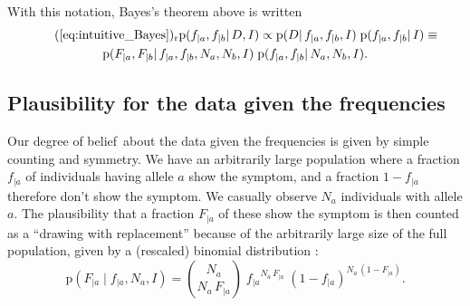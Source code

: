\documentclass[\ifafour a4paper,12pt,\else a5paper,10pt,\fi%
onecolumn,oneside,article,%
british%
]{memoir}
\theoremstyle{remark}
\theoremstyle{innote}
\renewcommand*{\cites}{\parencites}
\newcommand*{\pf}{\mathrm{p}}%
\renewcommand*{\|}{\mathpunct{|}}
\newcommand*{\sect}{\S}%
\newcommand*{\chap}{ch.}%
\newcommand*{\labelbis}[1]{\tag*{(\ref{#1})$_\text{r}$}}
\newcommand*{\dob}{degree of belief}
\newcommand*{\snp}{\textsc{snp}}
\newcommand*{\yD}{D}
\newcommand*{\yI}{I}
\newcommand*{\ya}{a}
\newcommand*{\yb}{b}
\newcommand*{\ysS}{s}%
\begin{document}

With this notation, Bayes's theorem above is written
\begin{multline}
  \labelbis{eq:intuitive_Bayes}
  \pf(f_{|\ya}, f_{|\yb} \| \yD, \yI)
  \propto
  \pf(\yD \|f_{|\ya}, f_{|\yb}, \yI)\;
  \pf(f_{|\ya}, f_{|\yb} \| \yI)
  \equiv{}\\
  \pf(F_{|\ya}, F_{|\yb} \|f_{|\ya}, f_{|\yb}, N_{\ya},N_{\yb},\yI)\;
  \pf(f_{|\ya}, f_{|\yb} \| N_{\ya},N_{\yb},\yI).
\end{multline}

\medskip

\subsection{Plausibility for the data given the frequencies}
\label{sec:p_data_from_freqs}

Our \dob\ about the data given the frequencies is given by simple counting
and symmetry. We have an arbitrarily large population where a fraction
$f_{|\ya}$ of individuals having allele $\ya$ show the symptom, and a
fraction $1- f_{|\ya}$ therefore don't show the symptom. We casually
observe $N_{\ya}$ individuals with allele $\ya$. The plausibility that a
fraction $F_{|\ya}$ of these show the symptom is then counted as a
\enquote{drawing with replacement} because of the arbitrarily large size of
the full population, given by a (rescaled) binomial distribution
\cites[\chap~3]{jaynes1994_r2003}[\sect~4.6]{ross1976_r2010}[\sect~VI.2]{feller1950_r1968}:
\begin{equation}
  \label{eq:sampling_belief}
  \pf( F_{|\ya} \| f_{|\ya},  N_{\ya}, \yI)
  =
\binom{N_{\ya}}{N_{\ya}\,F_{|\ya}}\;  {f_{|\ya}}^{N_{\ya}\,F_{|\ya}} \;
  {(1-f_{|\ya})}^{N_{\ya}\,(1-F_{|\ya})}.
\end{equation}
\end{document}
